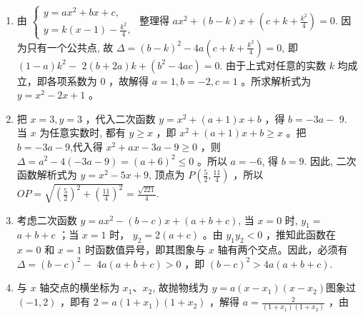 \documentclass[10pt]{article}
\begin{document}
\begin{enumerate}
  \item 由 $\left\{\begin{array}{l}y=a x^{2}+b x+c, \\ y=k(x-1)-\frac{k^{2}}{4},\end{array}\right.$ 整理得 $a x^{2}+(b-k) x+\left(c+k+\frac{k^{2}}{4}\right)=0$. 因为只有一个公共点, 故 $\Delta=(b-k)^{2}-4 a\left(c+k+\frac{k^{2}}{4}\right)=0$, 即 $(1-a) k^{2}-$ $2(b+2 a) k+\left(b^{2}-4 a c\right)=0$. 由于上式对任意的实数 $k$ 均成立，即各项系数为 0 ，故解得 $a=1, b=-2, c=1$ 。所求解析式为 $y=x^{2}-2 x+1$ 。
  \item 把 $x=3, y=3$ ，代入二次函数 $y=x^{2}+(a+1) x+b$ ，得 $b=-3 a-$ 9. 当 $x$ 为任意实数时, 都有 $y \geqslant x$ ，即 $x^{2}+(a+1) x+b \geqslant x$ 。把 $b=-3 a-9$,代入得 $x^{2}+a x-3 a-9 \geqslant 0$ ，则 $\Delta=a^{2}-4(-3 a-9)=(a+6)^{2} \leqslant 0$ 。所以 $a=-6$, 得 $b=9$. 因此, 二次函数解析式为 $y=x^{2}-5 x+9$, 顶点为 $P\left(\frac{5}{2}, \frac{11}{4}\right)$ ，所以 $O P=\sqrt{\left(\frac{5}{2}\right)^{2}+\left(\frac{11}{4}\right)^{2}}=\frac{\sqrt{221}}{4}$.
  \item 考虑二次函数 $y=a x^{2}-(b-c) x+(a+b+c)$, 当 $x=0$ 时, $y_{1}=$ $a+b+c$ ；当 $x=1$ 时， $y_{2}=2(a+c)$ 。由 $y_{1} y_{2}<0$ ，推知此函数在 $x=0$ 和 $x=1$ 时函数值异号，即其图象与 $x$ 轴有两个交点。因此，必须有 $\Delta=(b-c)^{2}-$ $4 a(a+b+c)>0$ ，即 $(b-c)^{2}>4 a(a+b+c)$.
  \item 与 $x$ 轴交点的横坐标为 $x_{1} 、 x_{2}$, 故抛物线为 $y=a\left(x-x_{1}\right)\left(x-x_{2}\right)$图象过 $(-1,2)$ ，即有 $2=a\left(1+x_{1}\right)\left(1+x_{2}\right)$ ，解得 $a=\frac{2}{\left(1+x_{1}\right)\left(1+x_{2}\right)}$ ，由
\end{enumerate}
\end{document}
